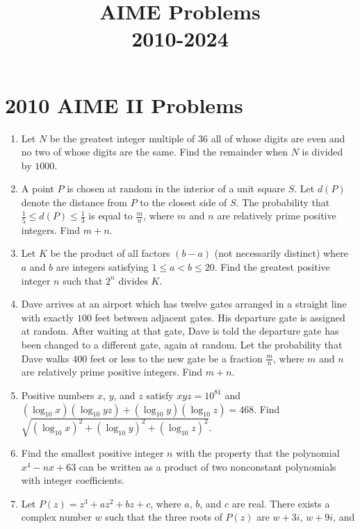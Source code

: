 \documentclass{article}
\title{AIME Problems \\ 2010-2024}
\date{}
\begin{document}
\maketitle\thispagestyle{fancy}\tableofcontents\newpage\section*{2010 AIME II Problems}

\begin{enumerate}[label=\arabic*., itemsep=0.5em]
\item Let \(N\) be the greatest integer multiple of \(36\) all of whose digits are even and no two of whose digits are the same. Find the remainder when \(N\) is divided by \(1000\).\par \vspace{0.5em}\item A point \(P\) is chosen at random in the interior of a unit square \(S\). Let \(d(P)\) denote the distance from \(P\) to the closest side of \(S\). The probability that \(\frac{1}{5}\le d(P)\le\frac{1}{3}\) is equal to \(\frac{m}{n}\), where \(m\) and \(n\) are relatively prime positive integers. Find \(m+n\).\par \vspace{0.5em}\item Let \(K\) be the product of all factors \((b-a)\) (not necessarily distinct) where \(a\) and \(b\) are integers satisfying \(1\le a < b \le 20\). Find the greatest positive integer \(n\) such that \(2^n\) divides \(K\).\par \vspace{0.5em}\item Dave arrives at an airport which has twelve gates arranged in a straight line with exactly \(100\) feet between adjacent gates. His departure gate is assigned at random. After waiting at that gate, Dave is told the departure gate has been changed to a different gate, again at random. Let the probability that Dave walks \(400\) feet or less to the new gate be a fraction \(\frac{m}{n}\), where \(m\) and \(n\) are relatively prime positive integers. Find \(m+n\).\par \vspace{0.5em}\item Positive numbers \(x\), \(y\), and \(z\) satisfy \(xyz = 10^{81}\) and \((\log_{10}x)(\log_{10} yz) + (\log_{10}y) (\log_{10}z) = 468\). Find \(\sqrt {(\log_{10}x)^2 + (\log_{10}y)^2 + (\log_{10}z)^2}\).\par \vspace{0.5em}\item Find the smallest positive integer \(n\) with the property that the polynomial \(x^4 - nx + 63\) can be written as a product of two nonconstant polynomials with integer coefficients.\par \vspace{0.5em}\item Let \(P(z)=z^3+az^2+bz+c\), where \(a\), \(b\), and \(c\) are real. There exists a complex number \(w\) such that the three roots of \(P(z)\) are \(w+3i\), \(w+9i\), and 
\end{enumerate}
\end{document}
